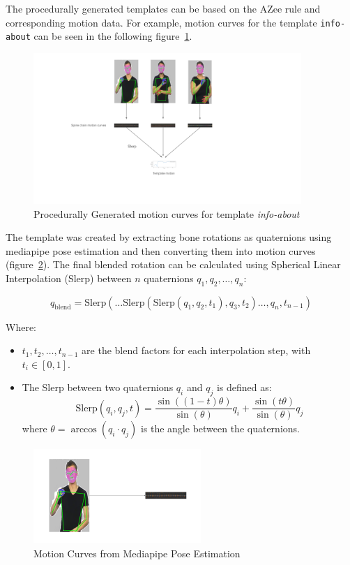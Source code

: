 \documentclass[../../main.tex]{subfiles}
\begin{document}
The procedurally generated templates can be based on the AZee rule and corresponding motion data. For example, motion curves for the template \texttt{info-about} can be seen in the following figure~\ref{fig:motion_curves_template_procedural}.

\begin{figure}
    \centering \includegraphics[width = 4in]{chapters/intermediate_blocks/images/motion_curves_template_procedural.png}
    \caption{Procedurally Generated motion curves for template \emph{info-about}}
    \label{fig:motion_curves_template_procedural}
\end{figure}

The template was created by extracting bone rotations as quaternions using mediapipe pose estimation and then converting them into motion curves (figure~\ref{fig:motion_curves_mediapipe}). The final blended rotation can be calculated using Spherical Linear Interpolation (Slerp) between \( n \) quaternions \( q_1, q_2, \dots, q_n \):

\[
q_{\text{blend}} = \text{Slerp}\left(\dots \text{Slerp}\left(\text{Slerp}(q_1, q_2, t_1), q_3, t_2 \right) \dots , q_n, t_{n-1} \right)
\]

Where:
\begin{itemize}
    \item \( t_1, t_2, \dots, t_{n-1} \) are the blend factors for each interpolation step, with \( t_i \in [0, 1] \).
    \item The Slerp between two quaternions \( q_i \) and \( q_j \) is defined as:
    \[
    \text{Slerp}(q_i, q_j, t) = \frac{\sin((1-t)\theta)}{\sin(\theta)} q_i + \frac{\sin(t\theta)}{\sin(\theta)} q_j
    \]
    where \( \theta = \arccos(q_i \cdot q_j) \) is the angle between the quaternions.
\end{itemize}

\begin{figure}
    \centering \includegraphics[width = 2.5in]{chapters/intermediate_blocks/images/motion_curves_mediapipe.png}
    \caption{Motion Curves from Mediapipe Pose Estimation}
    \label{fig:motion_curves_mediapipe}
\end{figure}
\end{document}
